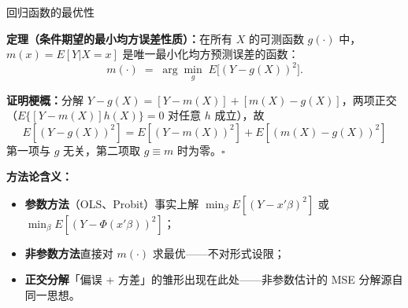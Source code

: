 \documentclass[aspectratio=169, 10pt]{beamer}
\begin{document}
\begin{frame}{回归函数的最优性}

  \begin{highlightbox}
    \textbf{定理（条件期望的最小均方误差性质）：}在所有 $X$ 的可测函数 $g(\cdot)$ 中，$m(x)=E[Y|X=x]$ 是唯一最小化均方预测误差的函数：
    \[
      m(\cdot) \;=\; \arg\min_{g}\; E\bigl[(Y - g(X))^2\bigr].
    \]
  \end{highlightbox}

  \vspace{0.3em}

  \textbf{证明梗概：}分解 $Y-g(X) = [Y-m(X)] + [m(X)-g(X)]$，两项正交（$E\{[Y-m(X)]h(X)\}=0$ 对任意 $h$ 成立），故
  \[
    E[(Y-g(X))^2] = E[(Y-m(X))^2] + E[(m(X)-g(X))^2]
  \]
  \hypertarget{main-b1}{}第一项与 $g$ 无关，第二项取 $g\equiv m$ 时为零。\quad$\square$\ \hfill{\scriptsize\hyperlink{proof-b1}{}}


  \begin{keybox}
    \textbf{方法论含义：}
    \begin{itemize}
      \item \textbf{参数方法}（OLS、Probit）事实上解 $\min_\beta E[(Y-x'\beta)^2]$ 或 $\min_\beta E[(Y-\Phi(x'\beta))^2]$；
      \item \textbf{非参数方法}直接对 $m(\cdot)$ 求最优——不对形式设限；
      \item \textbf{正交分解}「偏误 + 方差」的雏形出现在此处——非参数估计的 MSE 分解源自同一思想。
    \end{itemize}
  \end{keybox}

\end{frame}
\end{document}

